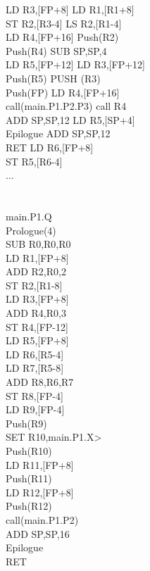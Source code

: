 \documentclass[10pt,a4paper]{article}
\begin{document}
\begin{tabbing}
LD R3,[FP+8]\> LD R1,[R1+8]\\
ST R2,[R3-4]\> LS R2,[R1-4]\\
LD R4,[FP+16]\> Push(R2)\\
Push(R4)\> SUB SP,SP,4\\
LD R5,[FP+12]\> LD R3,[FP+12]\\
Push(R5)\> PUSH (R3)\\
Push(FP)\> LD R4,[FP+16]\\
call(main.P1.P2.P3)\> call R4\\
ADD SP,SP,12\> LD R5,[SP+4]\\
Epilogue\> ADD SP,SP,12\\
RET\> LD R6,[FP+8]\\
\> ST R5,[R6-4]\\
\> ...\\
\\
\\
main.P1.Q\>\\
Prologue(4)\>\\
SUB R0,R0,R0\>\\
LD R1,[FP+8]\>\\
ADD R2,R0,2\>\\
ST R2,[R1-8]\>\\
LD R3,[FP+8]\>\\
ADD R4,R0,3\\
ST R4,[FP-12]\\
LD R5,[FP+8]\>\\
LD R6,[R5-4]\>\\
LD R7,[R5-8]\>\\
ADD R8,R6,R7\>\\
ST R8,[FP-4]\>\\
LD R9,[FP-4]\>\\
Push(R9)\>\\
SET R10,main.P1.X>\\
Push(R10)\>\\
LD R11,[FP+8]\>\\
Push(R11)\>\\
LD R12,[FP+8]\>\\
Push(R12)\>\\
call(main.P1.P2)\>\\
ADD SP,SP,16\>\\
Epilogue\>\\
RET\\
\end{tabbing} 
\end{document}

